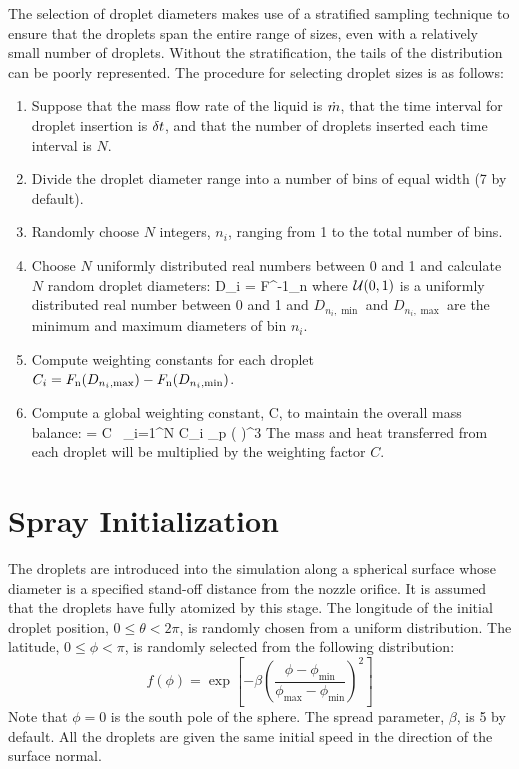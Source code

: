 The selection of droplet diameters makes use of a stratified sampling technique to ensure that the droplets span the entire range of sizes, even with a relatively small number of droplets. Without the stratification, the tails of the distribution can be poorly represented. The procedure for selecting droplet sizes is as follows:
\begin{enumerate}
\item Suppose that the mass flow rate of the liquid is $\dot{m}$, that the time interval for droplet insertion is $\delta t$, and that the number of droplets inserted each time interval is $N$.
\item Divide the droplet diameter range into a number of bins of equal width (7 by default).
\item Randomly choose $N$ integers, $n_i$, ranging from 1 to the total number of bins.
\item Choose $N$ uniformly distributed real numbers between 0 and 1 and calculate $N$ random droplet diameters:
\be
   D_i = F^{-1}_{\rm n}  \label{Ud_strat}
\ee
where ${\cal U}(0,1)$ is a uniformly distributed real number between 0 and 1 and $D_{n_i,\min}$ and $D_{n_i,\max}$ are the minimum and maximum diameters of bin $n_i$.
\item Compute weighting constants for each droplet $C_i = F_{\rm n}(D_{n_i,\max}) - F_{\rm n}(D_{n_i,\min})$.
\item Compute a global weighting constant, C, to maintain the overall mass balance:
    \be \dm \; \dt = C \, \sum_{i=1}^N \; C_i \;  \pi \rho_{\rm p}
      \left(  \right)^3
    \ee
    The mass and heat transferred from each droplet will be multiplied by the weighting factor $C$.
\end{enumerate}


\section{Spray Initialization}

The droplets are introduced into the simulation along a spherical surface whose diameter is a specified stand-off distance from the nozzle orifice. It is assumed that the droplets have fully atomized by this stage. The longitude of the initial droplet position, $0\le \theta < 2 \pi$, is randomly chosen from a uniform distribution. The latitude, $0 \le \phi < \pi$, is randomly selected from the following distribution:
\begin{equation}
  f(\phi) = \exp \left[ - \beta \left( \frac{\phi - \phi_{\min}}{\phi_{\max} - \phi_{\min}} \right)^2 \right]
\end{equation}
Note that $\phi=0$ is the south pole of the sphere. The spread parameter, $\beta$, is 5 by default. All the droplets are given the same initial speed in the direction of the surface normal.



